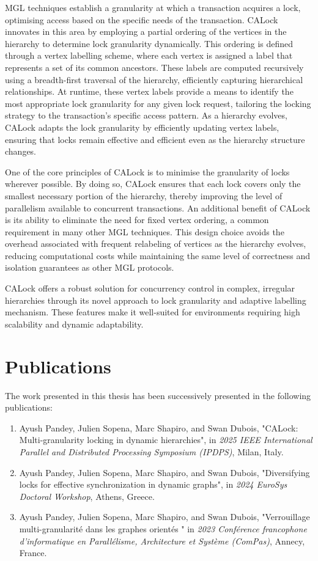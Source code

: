 MGL techniques establish a granularity at which a transaction acquires a lock, optimising access based on the specific needs of the transaction. CALock innovates in this area by employing a partial ordering of the vertices in the hierarchy to determine lock granularity dynamically. This ordering is defined through a vertex labelling scheme, where each vertex is assigned a label that represents a set of its common ancestors. These labels are computed recursively using a breadth-first traversal of the hierarchy, efficiently capturing hierarchical relationships. At runtime, these vertex labels provide a means to identify the most appropriate lock granularity for any given lock request, tailoring the locking strategy to the transaction's specific access pattern. As a hierarchy evolves, CALock adapts the lock granularity by efficiently updating vertex labels, ensuring that locks remain effective and efficient even as the hierarchy structure changes.

One of the core principles of CALock is to minimise the granularity of locks wherever possible. By doing so, CALock ensures that each lock covers only the smallest necessary portion of the hierarchy, thereby improving the level of parallelism available to concurrent transactions. An additional benefit of CALock is its ability to eliminate the need for fixed vertex ordering, a common requirement in many other MGL techniques. This design choice avoids the overhead associated with frequent relabeling of vertices as the hierarchy evolves, reducing computational costs while maintaining the same level of correctness and isolation guarantees as other MGL protocols.

CALock offers a robust solution for concurrency control in complex, irregular hierarchies through its novel approach to lock granularity and adaptive labelling mechanism. These features make it well-suited for environments requiring high scalability and dynamic adaptability.

\newpage
\section*{Publications}

The work presented in this thesis has been successively presented in the following publications:

\begin{enumerate}
    \item Ayush Pandey, Julien Sopena, Marc Shapiro, and Swan Dubois, "CALock: Multi-granularity locking in dynamic hierarchies", in \emph{2025 IEEE International Parallel and Distributed Processing Symposium (IPDPS)}, Milan, Italy.
    \item Ayush Pandey, Julien Sopena, Marc Shapiro, and Swan Dubois, "Diversifying locks for effective synchronization in dynamic graphs", in \emph{2024 EuroSys Doctoral Workshop}, Athens, Greece.
    \item Ayush Pandey, Julien Sopena, Marc Shapiro, and Swan Dubois, "Verrouillage multi-granularité dans les graphes orientés " in \emph{2023 Conférence francophone d'informatique en Parallélisme, Architecture et Système (ComPas)}, Annecy, France.
\end{enumerate}


